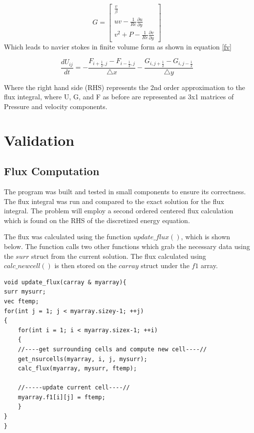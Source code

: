 \documentclass[paper=a4, fontsize=11pt, abstract=on]{scrartcl}
\numberwithin{equation}{section}		%
\numberwithin{figure}{section}			%
\numberwithin{table}{section}				%
\begin{document}
\begin{equation}
\label{nav4}
G= \begin{bmatrix}
    \frac{v}{\beta}    \\
   uv-\frac{1}{Re}\frac{\partial u}{\partial y} \\
    v^2+P-\frac{1}{Re}\frac{\partial v}{\partial y} 
\end{bmatrix}
\end{equation} 
Which leads to navier stokes in finite volume form as shown in equation \ref{fv}


\begin{equation}
\label{fv}
\frac{d U_{ij}}{d t} = -\frac{F_{i+\frac{1}{2},j}-F_{i-\frac{1}{2},j}}{\triangle x} -\frac{G_{i, j+\frac{1}{2}}-G_{i,j-\frac{1}{2}}}{\triangle y}
\end{equation} 

Where the right hand side (RHS) represents the 2nd order approximation to the flux integral, where U, G, and F as before are represented as 3x1 matrices of Pressure and velocity components.
\section{Validation}
\subsection{Flux Computation}

 The program was built and tested in small components to ensure its correctness. The flux integral was run and compared to the exact solution for the flux integral. The problem will employ a second ordered centered flux calculation which is found on the RHS of the discretized energy equation.


The flux was calculated using the function $update\_ flux()$, which is shown below. The function calls two other functions which grab the necessary data using the $surr$ struct from the current solution. The flux calculated using $calc\_ newcell()$ is then stored on the $carray$ struct under the $f1$ array.

\begin{lstlisting}
void update_flux(carray & myarray){
surr mysurr;
vec ftemp;
for(int j = 1; j < myarray.sizey-1; ++j)
{
    for(int i = 1; i < myarray.sizex-1; ++i)
    {
    //----get surrounding cells and compute new cell----//
    get_nsurcells(myarray, i, j, mysurr);    
    calc_flux(myarray, mysurr, ftemp); 
    
    //-----update current cell----//  
    myarray.f1[i][j] = ftemp;   
    }
}
}
\end{lstlisting}
\end{document}
